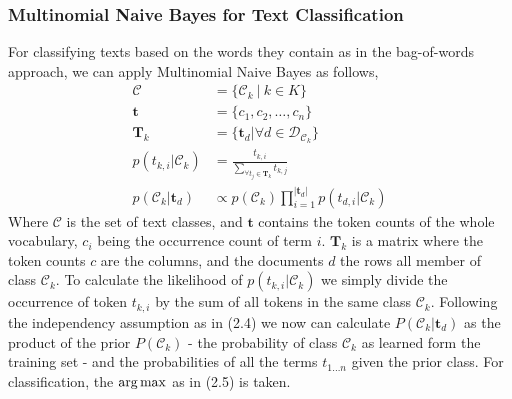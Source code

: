\subsubsection{Multinomial Naive Bayes for Text Classification}
For classifying texts based on the words they contain as in the bag-of-words approach, we can apply Multinomial Naive Bayes as follows,
\begin{align}
  \mathcal{C} &= \{\mathcal{C}_k \: | \: k \in K \} \\
  \boldsymbol{t} &= \{c_1, c_2, \dots, c_n\} \\
  \boldsymbol{T}_{k} &= \{\boldsymbol{t}_d | \forall d \in \mathcal{D}_{\mathcal{C}_{k}}\} \\
  p({t_{k,i}}|\mathcal{C}_k) &= \frac{t_{k, i}}{\sum_{\forall t_j \in \boldsymbol{T}_k} t_{k, j}} \\
  p(\mathcal{C}_k|\boldsymbol{t}_d) &\propto p(\mathcal{C}_k) \prod_{i=1}^{|\boldsymbol{t}_d|}  p(t_{d,i}|\mathcal{C}_k)
\end{align}
Where $\mathcal{C}$ is the set of text classes, and $\boldsymbol{t}$ contains the token counts of the whole vocabulary, $c_i$ being the occurrence count of term $i$. $\boldsymbol{T}_k$ is a matrix where the token counts $c$ are the columns, and the documents $d$ the rows all member of class $\mathcal{C}_k$. To calculate the likelihood of $p({t_{k,i}}|\mathcal{C}_k)$ we simply divide the occurrence of token $t_{k,i}$ by the sum of all tokens in the same class $\mathcal{C}_k$. Following the independency assumption as in (2.4) we now can calculate $P(\mathcal{C}_k | \boldsymbol{t}_d)$ as the product of the prior $P(\mathcal{C}_k)$ - the probability of class $\mathcal{C}_k$
as learned form the training set - and the probabilities of all the terms $t_{1 \dots n}$ given the prior class. For classification, the $\operatorname*{arg\,max}$ as in (2.5) is taken.

